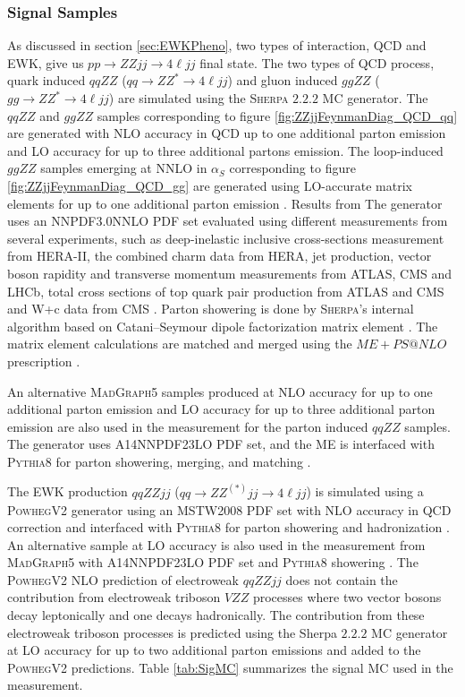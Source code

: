 \subsubsection{Signal Samples}
\label{subsubsec:SigSamples}
As discussed in section \ref{sec:EWKPheno}, two types of interaction, QCD and EWK, give us $pp \rightarrow ZZjj\rightarrow 4 \ell jj$ final state. The two types of QCD process, quark induced $qqZZ$ ($qq \rightarrow ZZ^* \rightarrow 4 \ell jj$) and gluon induced $ggZZ$ ($gg \rightarrow ZZ^* \rightarrow 4\ell jj$) are simulated using the \textsc{Sherpa} $2.2.2$ MC generator. The $qqZZ$ and $ggZZ$ samples corresponding to figure \ref{fig:ZZjjFeynmanDiag_QCD_qq} are generated with NLO accuracy in QCD up to one additional parton emission and LO accuracy for up to three additional partons emission. The loop-induced $ggZZ$ samples emerging at NNLO in $\alpha_{S}$ corresponding to figure \ref{fig:ZZjjFeynmanDiag_QCD_gg} are generated using LO-accurate matrix elements for up to one additional parton emission \cite{EventGenWithSherpa}. Results from The generator uses an NNPDF3.0NNLO PDF set evaluated using different measurements from several experiments, such as deep-inelastic inclusive cross-sections measurement from HERA-II, the combined charm data from HERA, jet production, vector boson rapidity and transverse momentum measurements from ATLAS, CMS and LHCb, total cross sections of top quark pair production from ATLAS and CMS and W+c data from CMS \cite{PDFForRunII}. Parton showering is done by \textsc{Sherpa}'s internal algorithm based on Catani–Seymour dipole factorization matrix element \cite{SherpaPS}. The matrix element calculations are matched and merged using the $ME+PS@NLO$ prescription \cite{PSMatching}. 

An alternative \textsc{MadGraph5} samples produced at NLO accuracy for up to one additional parton emission and LO accuracy for up to three additional parton emission \cite{MADGRAPHNLO} are also used in the measurement for the parton induced $qqZZ$ samples. The generator uses A14NNPDF23LO PDF set, and the ME is interfaced with \textsc{Pythia8} for parton showering, merging, and matching \cite{Pythia8}. 

The EWK production $qqZZjj$ ($qq \rightarrow ZZ^{(*)}jj \rightarrow 4 \ell jj$) is simulated using a \textsc{PowhegV2} generator using an MSTW2008 PDF set with NLO accuracy in QCD correction and interfaced with \textsc{Pythia8} for parton showering and hadronization \cite{PowhegV2}. An alternative sample at LO accuracy is also used in the measurement from \textsc{MadGraph5} with A14NNPDF23LO PDF set and \textsc{Pythia8} showering \cite{MADGRAPHNLO}. The \textsc{PowhegV2} NLO prediction of electroweak $qqZZjj$ does not contain the contribution from electroweak triboson $VZZ$ processes where two vector bosons decay leptonically and one decays hadronically. The contribution from these electroweak triboson processes is predicted using the {Sherpa} $2.2.2$ MC generator at LO accuracy for up to two additional parton emissions and added to the \textsc{PowhegV2} predictions. Table \ref{tab:SigMC} summarizes the signal MC used in the measurement. 


